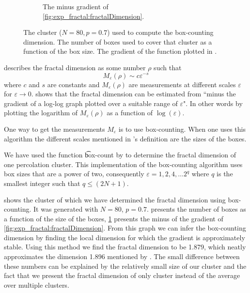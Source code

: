 \begin{figure}
\begin{subfigure}[t]{0.3\textwidth}
		\caption{The minus gradient of \cref{fig:exp_fractal:fractalDimension}.}
		\label{fig:exp_fractal:fractalDimensionGradient}
	\end{subfigure}		
	\caption{ The cluster ($N = 80, p = 0.7$) used to compute the box-counting dimension.  The number of boxes used to cover that cluster as a function of the box size.  The gradient of the function plotted in .}
	\label{fig:exp:dimension:plaatjes}
\end{figure}

\textcite{falconer2004fractal} describes the fractal dimension as some number $\rho$ such that
\begin{equation}
	M_\varepsilon(\rho) \sim c\varepsilon^{-s}
\end{equation}
where $c$ and $s$ are constants and $M_\varepsilon(\rho)$ are measurements at different scales $\varepsilon$ for $\varepsilon \to 0$. \citeauthor{falconer2004fractal} shows that the fractal dimension can be estimated from ``minus the gradient of a log-log graph plotted over a suitable range of $\varepsilon$". In other words by plotting the logarithm of $M_\varepsilon(\rho)$ as a function of $\log(\varepsilon)$.

One way to get the measurements $M_\varepsilon$ is to use box-counting. When one uses this algorithm the different scales mentioned in \citeauthor{falconer2004fractal}'s definition are the sizes of the boxes.

We have used the function \t{box-count} by \textcite{boxCounting} to determine the fractal dimension of one percolation cluster. This implementation of the box-counting algorithm uses box sizes that are a power of two, consequently $\varepsilon = 1, 2, 4, \dotsc 2^q$ where $q$ is the smallest integer such that $q \leq (2N + 1)$. 

 shows the cluster of which we have determined the fractal dimension using box-counting. It was generated with $N = 80$, $p = 0.7$.  presents the number of boxes as a function of the size of the boxes, \cref{fig:exp_fractal:fractalDimensionGradient} presents the minus of the gradient of \cref{fig:exp_fractal:fractalDimension}. From this graph we can infer the box-counting dimension by finding the local dimension for which the gradient is approximately stable. Using this method we find the fractal dimension to be \num{1.879}, which neatly approximates the dimension \num{1.896} mentioned by \textcite{stauffer1994introduction}. The small difference between these numbers can be explained by the relatively small size of our cluster and the fact that we present the fractal dimension of only cluster instead of the average over multiple clusters. 